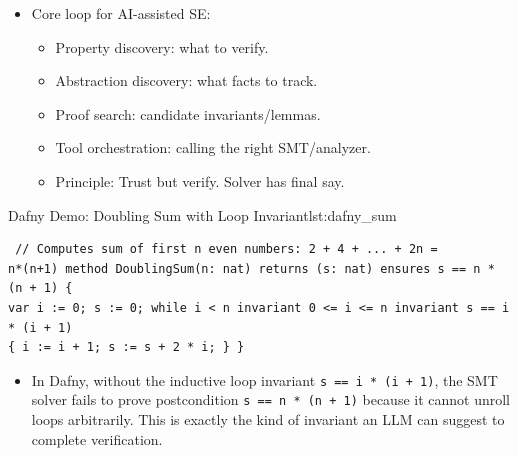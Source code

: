 \begin{itemize}
\item Core loop for AI-assisted SE:
\begin{itemize}
    \item Property discovery: what to verify.
    \item Abstraction discovery: what facts to track.
    \item Proof search: candidate invariants/lemmas.
    \item Tool orchestration: calling the right SMT/analyzer.
    \item Principle: Trust but verify. Solver has final say.
\end{itemize}

\end{itemize}

\begin{ppprogram}{Dafny Demo: Doubling Sum with Loop Invariant}{lst:dafny_sum}
\begin{lstlisting} // Computes sum of first n even numbers: 2 + 4 + ... + 2n =
n*(n+1) method DoublingSum(n: nat) returns (s: nat) ensures s == n * (n + 1) {
var i := 0; s := 0; while i < n invariant 0 <= i <= n invariant s == i * (i + 1)
{ i := i + 1; s := s + 2 * i; } } \end{lstlisting} \end{ppprogram}

\begin{itemize} \item In Dafny, without the inductive loop invariant \texttt{s
== i * (i + 1)}, the SMT solver fails to prove postcondition \texttt{s == n * (n
+ 1)} because it cannot unroll loops arbitrarily. This is exactly the kind of
invariant an LLM can suggest to complete verification. \end{itemize}

